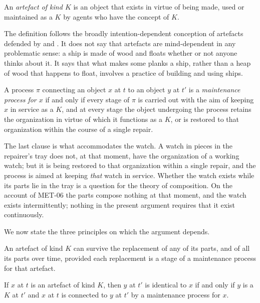 \documentclass{situationist-preprint}
\begin{document}
\begin{definition}
An \emph{artefact of kind $K$} is an object that exists in virtue of being made, used or maintained as a $K$ by agents who have the concept of $K$.
\end{definition}

The definition follows the broadly intention-dependent conception of artefacts defended by \citet{Baker2007} and \citet{Thomasson2007}. It does not say that artefacts are mind-dependent in any problematic sense: a ship is made of wood and floats whether or not anyone thinks about it. It says that what makes some planks a ship, rather than a heap of wood that happens to float, involves a practice of building and using ships.

\begin{definition}
A process $\pi$ connecting an object $x$ at $t$ to an object $y$ at $t'$ is a \emph{maintenance process for $x$} if and only if every stage of $\pi$ is carried out with the aim of keeping $x$ in service as a $K$, and at every stage the object undergoing the process retains the organization in virtue of which it functions as a $K$, or is restored to that organization within the course of a single repair.
\end{definition}

The last clause is what accommodates the watch. A watch in pieces in the repairer's tray does not, at that moment, have the organization of a working watch; but it is being restored to that organization within a single repair, and the process is aimed at keeping \emph{that} watch in service. Whether the watch exists while its parts lie in the tray is a question for the theory of composition. On the account of MET-06 the parts compose nothing at that moment, and the watch exists intermittently; nothing in the present argument requires that it exist continuously.

We now state the three principles on which the argument depends.

\begin{principle}[Tolerance]\label{p:tolerance}
An artefact of kind $K$ can survive the replacement of any of its parts, and of all its parts over time, provided each replacement is a stage of a maintenance process for that artefact.
\end{principle}

\begin{principle}[Maintenance]\label{p:maintenance}
If $x$ at $t$ is an artefact of kind $K$, then $y$ at $t'$ is identical to $x$ if and only if $y$ is a $K$ at $t'$ and $x$ at $t$ is connected to $y$ at $t'$ by a maintenance process for $x$.
\end{principle}
\end{document}
